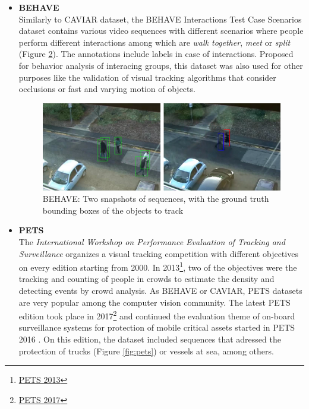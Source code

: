 \begin{itemize}
\begin{figure}[H]
\begin{center}
\caption{CAVIAR: From  left  to right, two frames (ground truth superposed) from sequences of datasets 1 (entrance lobby of INRIA Labs) and 2 (hallway of a shopping center) ~\cite{dubuisson2016survey}}
\label{fig:caviar}
\end{center}
\end{figure}
\item \textbf{BEHAVE} \cite{dubuisson2016survey}\\
Similarly to CAVIAR dataset, the BEHAVE Interactions Test Case Scenarios dataset contains various video sequences with different scenarios where people perform different interactions among which are \textit{walk together}, \textit{meet} or \textit{split} (Figure \ref{fig:behave}). The annotations include labels in case of interactions. Proposed for behavior analysis of interacing groups, this dataset was also used for other purposes like the validation of visual tracking algorithms that consider occlusions or fast and varying motion of objects.
\begin{figure}[H]
\begin{center}
\includegraphics[scale=0.38]{previous_version/behave.png}
\caption{BEHAVE: Two snapshots of sequences, with the ground truth bounding boxes of the objects to track \cite{dubuisson2016survey}}
\label{fig:behave}
\end{center}
\end{figure}
\item \textbf{PETS} \cite{dubuisson2016survey}\\
The \textit{International Workshop on Performance Evaluation of Tracking and Surveillance} organizes a visual tracking competition with different objectives on every edition starting from 2000. In 2013\footnote {\href{http://www.cvg.reading.ac.uk/PETS2013/index.html}{PETS 2013}}, two of the objectives were the tracking and counting of people in crowds to estimate the density and detecting events by crowd analysis. As BEHAVE or CAVIAR, PETS datasets are very popular among the computer vision community. The latest PETS edition took place in 2017\footnote {\href{http://openaccess.thecvf.com/content_cvpr_2017_workshops/w34/papers/Patino_PETS_2017_Dataset_CVPR_2017_paper.pdf}{PETS 2017}} and continued the evaluation theme of on-board surveillance systems for protection of mobile critical assets started in PETS 2016 \cite{patino2016pets}. On this edition, the dataset included sequences that adressed the protection of trucks (Figure \ref{fig:pets}) or vessels at sea, among others.

\end{itemize}
